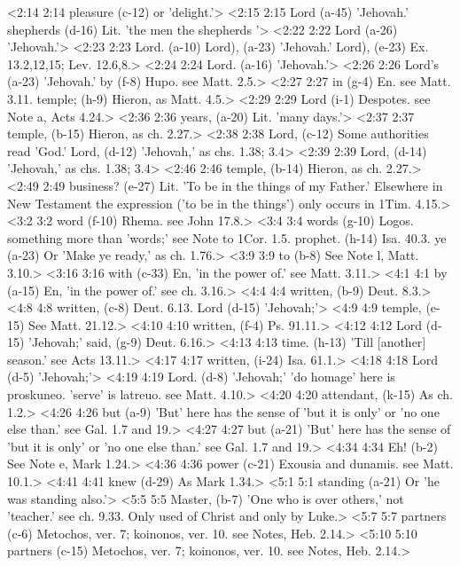 <2:14 2:14  pleasure (c-12)  or 'delight.'>
<2:15 2:15  Lord (a-45)  'Jehovah.'
  shepherds (d-16)  Lit. 'the men the shepherds '>
<2:22 2:22  Lord (a-26)  'Jehovah.'>
<2:23 2:23  Lord. (a-10)  Lord), (a-23)
  'Jehovah.'
  Lord), (e-23)  Ex. 13.2,12,15; Lev. 12.6,8.>
<2:24 2:24  Lord. (a-16)  'Jehovah.'>
<2:26 2:26  Lord's (a-23)  'Jehovah.'
  by (f-8)  Hupo. see Matt. 2.5.>
<2:27 2:27  in (g-4)  En. see Matt. 3.11.
  temple; (h-9)  Hieron, as Matt. 4.5.>
<2:29 2:29  Lord (i-1)  Despotes. see Note a, Acts 4.24.>
<2:36 2:36  years, (a-20)  Lit. 'many days.'>
<2:37 2:37  temple, (b-15)  Hieron, as ch. 2.27.>
<2:38 2:38  Lord, (c-12)  Some authorities read 'God.'
  Lord, (d-12) 'Jehovah,' as chs. 1.38; 3.4>
<2:39 2:39  Lord, (d-14)  'Jehovah,' as chs. 1.38; 3.4>
<2:46 2:46  temple, (b-14)  Hieron, as ch. 2.27.>
<2:49 2:49  business? (e-27)  Lit. 'To be in the things of my Father.' Elsewhere in New  Testament the expression ('to be in the things') only occurs in  1Tim. 4.15.>
<3:2 3:2  word (f-10)  Rhema. see John 17.8.>
<3:4 3:4  words (g-10)  Logos. something more than 'words;' see Note to 1Cor. 1.5.
  prophet. (h-14)  Isa. 40.3.
  ye (a-23)  Or 'Make ye ready,' as ch. 1.76.>
<3:9 3:9  to (b-8)  See Note l, Matt. 3.10.>
<3:16 3:16  with (c-33)  En, 'in the power of.' see Matt. 3.11.>
<4:1 4:1  by (a-15)  En, 'in the power of.' see ch. 3.16.>
<4:4 4:4  written, (b-9)  Deut. 8.3.>
<4:8 4:8  written, (c-8)  Deut. 6.13.
  Lord (d-15) 'Jehovah;'>
<4:9 4:9  temple, (e-15)  See Matt. 21.12.>
<4:10 4:10  written, (f-4)  Ps. 91.11.>
<4:12 4:12  Lord (d-15) 'Jehovah;'
  said, (g-9)  Deut. 6.16.>
<4:13 4:13  time. (h-13)  'Till [another] season.' see Acts 13.11.>
<4:17 4:17  written, (i-24)  Isa. 61.1.>
<4:18 4:18  Lord (d-5) 'Jehovah;'>
<4:19 4:19  Lord. (d-8)  'Jehovah;' 'do homage' here is proskuneo. 'serve' is  latreuo. see Matt. 4.10.>
<4:20 4:20  attendant, (k-15)  As ch. 1.2.>
<4:26 4:26  but (a-9) 'But' here has the sense of 'but it is only' or 'no one else than.' see Gal. 1.7 and 19.>
<4:27 4:27  but (a-21)  'But' here has the sense of 'but it is only' or 'no one else  than.' see Gal. 1.7 and 19.>
<4:34 4:34  Eh! (b-2)  See Note e, Mark 1.24.>
<4:36 4:36  power (c-21)  Exousia and dunamis. see Matt. 10.1.>
<4:41 4:41  knew (d-29)  As Mark 1.34.>
<5:1 5:1  standing (a-21)  Or 'he was standing also.'>
<5:5 5:5  Master, (b-7)  'One who is over others,' not 'teacher.' see ch. 9.33. Only  used of Christ and only by Luke.>
<5:7 5:7  partners (c-6) Metochos, ver. 7; koinonos, ver. 10. see Notes, Heb.  2.14.>
<5:10 5:10  partners (c-15)  Metochos, ver. 7; koinonos, ver. 10. see Notes, Heb.  2.14.>
